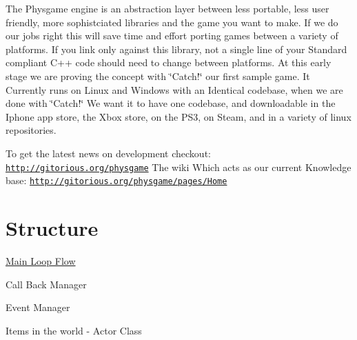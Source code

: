 The Physgame engine is an abstraction layer between less portable, less user friendly, more sophistciated libraries and the game you want to make. If we do our jobs right this will save time and effort porting games between a variety of platforms. If you link only against this library, not a single line of your Standard compliant C++ code should need to change between platforms. At this early stage we are proving the concept with \char`\"{}Catch!\char`\"{} our first sample game. It Currently runs on Linux and Windows with an Identical codebase, when we are done with \char`\"{}Catch!\char`\"{} We want it to have one codebase, and downloadable in the Iphone app store, the Xbox store, on the PS3, on Steam, and in a variety of linux repositories.

To get the latest news on development checkout: \href{http://gitorious.org/physgame}{\tt http://gitorious.org/physgame} The wiki Which acts as our current Knowledge base: \href{http://gitorious.org/physgame/pages/Home}{\tt http://gitorious.org/physgame/pages/Home}\hypertarget{index_Engine}{}\section{Structure}\label{index_Engine}
\hyperlink{mainloop1}{Main Loop Flow}

Call Back Manager

Event Manager

Items in the world -\/ Actor Class 